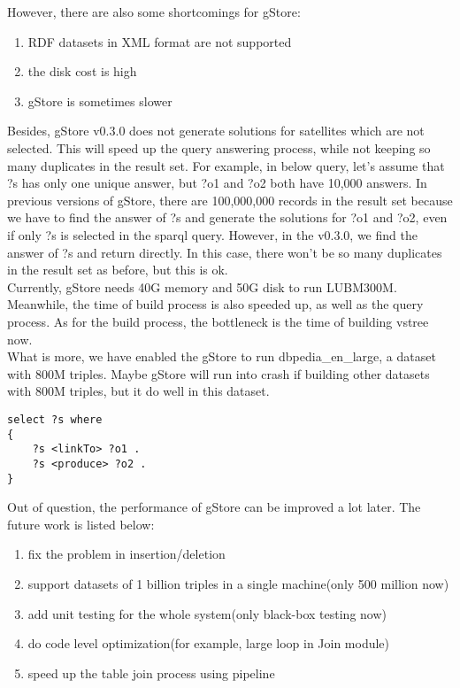 \documentclass[titlepage, a4paper, 12pt] {article}
\begin{document}
However, there are also some shortcomings for gStore:
\begin{enumerate}
	\item RDF datasets in XML format are not supported
	\item the disk cost is high
	\item gStore is sometimes slower
\end{enumerate}

Besides, gStore v0.3.0 does not generate solutions for satellites which are not selected. 
This will speed up the query answering process, while not keeping so many duplicates in the result set.
For example, in below query, let's assume that ?s has only one unique answer, but ?o1 and ?o2 both have 10,000 answers.
In previous versions of gStore, there are 100,000,000 records in the result set because we have to find the answer of ?s and generate the solutions for ?o1 and ?o2, even if only ?s is selected in the sparql query.
However, in the v0.3.0, we find the answer of ?s and return directly. In this case, there won't be so many duplicates in the result set as before, but this is ok.   \\

Currently, gStore needs 40G memory and 50G disk to run LUBM300M. Meanwhile, the time of build process is also speeded up, as well as the query process. As for the build process, the bottleneck is the time of building vstree now. \\

What is more, we have enabled the gStore to run dbpedia\_en\_large, a dataset with 800M triples. 
Maybe gStore will run into crash if building other datasets with 800M triples, but it do well in this dataset. \\

\begin{lstlisting}
select ?s where
{
	?s <linkTo> ?o1 .
	?s <produce> ?o2 .
}
\end{lstlisting}

Out of question, the performance of gStore can be improved a lot later. 
The future work is listed below:
\begin{enumerate}
	\item fix the problem in insertion/deletion 
	\item support datasets of 1 billion triples in a single machine(only 500 million now)
	\item add unit testing for the whole system(only black-box testing now)
	\item do code level optimization(for example, large loop in Join module)
	\item speed up the table join process using pipeline
\end{enumerate}
\end{document}
